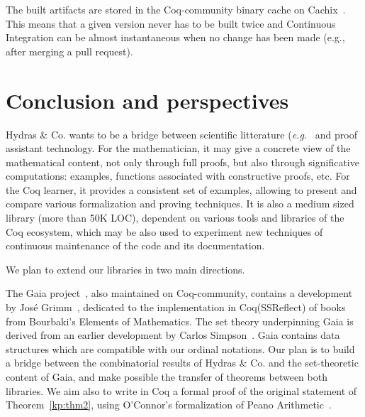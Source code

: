 \documentclass{easychair}
\newcommand{\TODO}[2][]{[\textcolor{red}{TODO (#1):} \emph{#2}]}
\newcommand{\coq}{Coq\xspace}
\newcommand{\community}{Coq-community\xspace}
\newcommand{\gaia}{Gaia\xspace}
\newcommand{\Hydras}{Hydras \& Co.\xspace}
\begin{document}
The built artifacts are stored in the \community binary cache on Cachix~\cite{cachix}.
%
This means that a given version never has to be built twice and Continuous Integration can be almost instantaneous when no change has been made (e.g., after merging a pull request).

\section{Conclusion and perspectives}


\Hydras wants to be a bridge between scientific litterature (\emph{e.g.}~\cite{KP82, KS81, schutte} and proof assistant technology. For the mathematician, it may give a concrete view of the mathematical content, not only through full proofs, but also through significative computations: examples, functions associated with constructive proofs, etc. For the \coq learner, it provides a consistent set of examples,
allowing to present and compare various formalization and proving techniques. %
It is also a medium sized library (more than 50K LOC), dependent on various tools and libraries of the \coq ecosystem, which  may be also used to experiment new techniques of continuous maintenance of the code and its documentation.










We plan to extend our libraries in two main directions.

The \gaia project~\cite{Gaia}, also maintained on \community, contains a development by José Grimm~\cite{grimm:hal-00911710},  dedicated  to the implementation in \coq (SSReflect) of books from  Bourbaki's Elements of Mathematics. The set theory underpinning \gaia is derived from an earlier development by Carlos Simpson~\cite{Simpson2004,CatsZFCContrib}. \gaia contains data structures which are compatible with our ordinal notations.
Our plan is to build a  bridge between  the combinatorial results of \Hydras and the set-theoretic content of \gaia, and make possible the transfer of theorems between both libraries.
We aim also to write in \coq a formal proof of the original statement of Theorem~\ref{kp:thm2}, using O'Connor's formalization of Peano Arithmetic~\cite{Goedel}.
\end{document}
